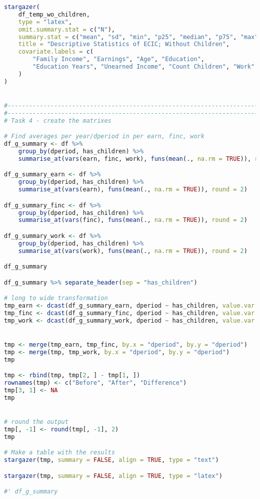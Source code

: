 \documentclass[a4paper]{article}
\begin{document}
\begin{lstlisting}[language=R]
stargazer(
    df_temp_wo_children,
    type = "latex",
    omit.summary.stat = c("N"),
    summary.stat = c("mean", "sd", "min", "p25", "median", "p75", "max"),
    title = "Descriptive Statistics of ECIC; Without Children",
    covariate.labels = c(
        "Family Income", "Earnings", "Age", "Education",
        "Education Years", "Unearned Income", "Count Children", "Work"
    )
)


#---------------------------------------------------------------------------------------
#---------------------------------------------------------------------------------------
# Task 4 - create the matrixes

# Find averages per year/dperiod in per earn, finc, work
df_g_summary <- df %>%
    group_by(dperiod, has_children) %>%
    summarise_at(vars(earn, finc, work), funs(mean(., na.rm = TRUE)), round = 2)

df_g_summary_earn <- df %>%
    group_by(dperiod, has_children) %>%
    summarise_at(vars(earn), funs(mean(., na.rm = TRUE)), round = 2)

df_g_summary_finc <- df %>%
    group_by(dperiod, has_children) %>%
    summarise_at(vars(finc), funs(mean(., na.rm = TRUE)), round = 2)

df_g_summary_work <- df %>%
    group_by(dperiod, has_children) %>%
    summarise_at(vars(work), funs(mean(., na.rm = TRUE)), round = 2)

df_g_summary

df_g_summary %>% separate_header(sep = "has_children")

# long to wide transformation
tmp_earn <- dcast(df_g_summary_earn, dperiod ~ has_children, value.var = c("earn"))
tmp_finc <- dcast(df_g_summary_finc, dperiod ~ has_children, value.var = c("finc"))
tmp_work <- dcast(df_g_summary_work, dperiod ~ has_children, value.var = c("work"))


tmp <- merge(tmp_earn, tmp_finc, by.x = "dperiod", by.y = "dperiod")
tmp <- merge(tmp, tmp_work, by.x = "dperiod", by.y = "dperiod")
tmp

tmp <- rbind(tmp, tmp[2, ] - tmp[1, ])
rownames(tmp) <- c("Before", "After", "Difference")
tmp[3, 1] <- NA
tmp


# round the output
tmp[, -1] <- round(tmp[, -1], 2)
tmp

# Make a table with the results
stargazer(tmp, summary = FALSE, align = TRUE, type = "text")

stargazer(tmp, summary = FALSE, align = TRUE, type = "latex")

#' df_g_summary



\end{lstlisting}
\end{document}
